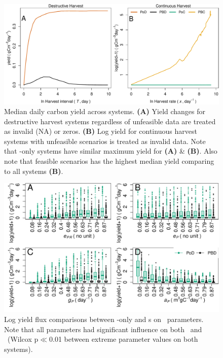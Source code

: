 \documentclass[../thesis.tex]{subfiles} %
\begin{document}
\begin{figure}[H]
    \centering
    \includegraphics[width=\linewidth]{result/DailyYield.pdf}
    \caption[Median daily carbon yield across systems]{Median daily carbon yield across systems.  \textbf{(A)} Yield changes for destructive harvest systems regardless of unfeasible data are treated as invalid (NA) or zeros.  \textbf{(B)} Log yield for continuous harvest systems with unfeasible scenarios is treated as invalid data.  Note that \phy-only systems have similar maximum yield for \textbf{(A)} \& \textbf{(B)}.  Also note that feasible scenarios has the highest median yield comparing to all systems \textbf{(B)}.\lnExplain}
    \label{f:ydDaily}
\end{figure}

\begin{figure}[H]
    \centering
    \includegraphics[width=\linewidth]{result/bacEff1.pdf}
    \caption[Log yield flux comparisons between feasible \phy-only and \pbs s]{Log yield flux comparisons between \phy-only and \pbs s on \phy\ parameters.  Note that all parameters had significant influence on both \PoN\ and \PBN\ (Wilcox p$\ll$0.01 between extreme parameter values on both systems).\lnExplain}
    \label{f:bacEffect}
\end{figure}
\end{document}
